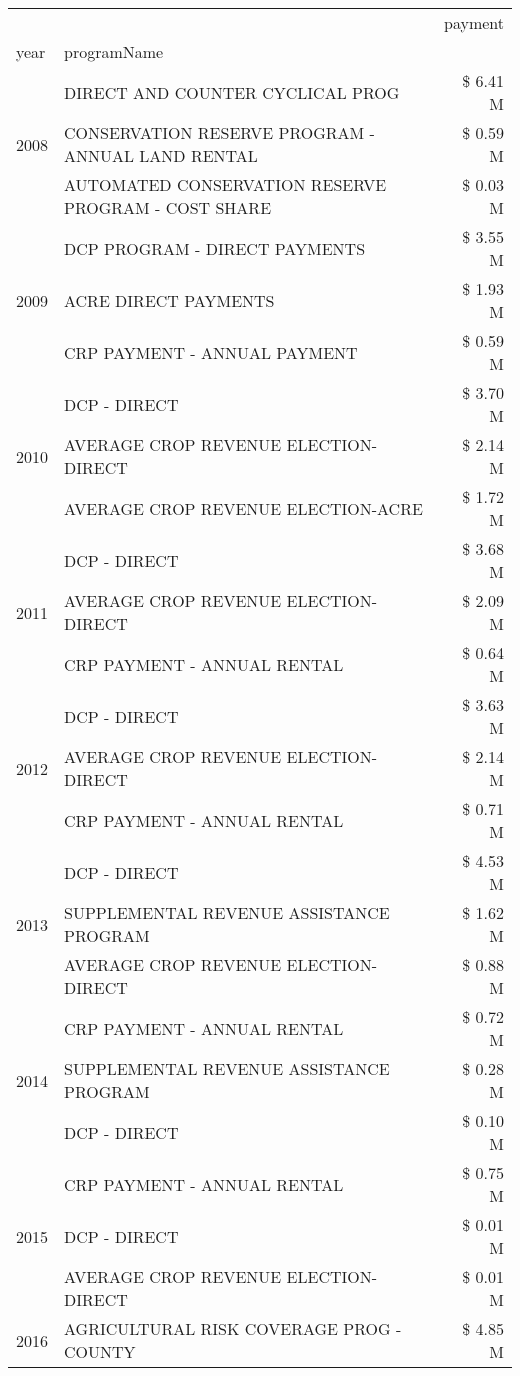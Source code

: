 \begin{tabular}{llr}
\toprule
 &  & payment \\
year & programName &  \\
\midrule
\multirow[t]{3}{*}{2008} & DIRECT AND COUNTER CYCLICAL PROG & \$ 6.41 M \\
 & CONSERVATION RESERVE PROGRAM - ANNUAL LAND RENTAL & \$ 0.59 M \\
 & AUTOMATED CONSERVATION RESERVE PROGRAM - COST SHARE & \$ 0.03 M \\
\cline{1-3}
\multirow[t]{3}{*}{2009} & DCP PROGRAM - DIRECT PAYMENTS & \$ 3.55 M \\
 & ACRE DIRECT PAYMENTS & \$ 1.93 M \\
 & CRP PAYMENT - ANNUAL PAYMENT & \$ 0.59 M \\
\cline{1-3}
\multirow[t]{3}{*}{2010} & DCP - DIRECT & \$ 3.70 M \\
 & AVERAGE CROP REVENUE ELECTION-DIRECT & \$ 2.14 M \\
 & AVERAGE CROP REVENUE ELECTION-ACRE & \$ 1.72 M \\
\cline{1-3}
\multirow[t]{3}{*}{2011} & DCP - DIRECT & \$ 3.68 M \\
 & AVERAGE CROP REVENUE ELECTION-DIRECT & \$ 2.09 M \\
 & CRP PAYMENT - ANNUAL RENTAL & \$ 0.64 M \\
\cline{1-3}
\multirow[t]{3}{*}{2012} & DCP - DIRECT & \$ 3.63 M \\
 & AVERAGE CROP REVENUE ELECTION-DIRECT & \$ 2.14 M \\
 & CRP PAYMENT - ANNUAL RENTAL & \$ 0.71 M \\
\cline{1-3}
\multirow[t]{3}{*}{2013} & DCP - DIRECT & \$ 4.53 M \\
 & SUPPLEMENTAL REVENUE ASSISTANCE PROGRAM & \$ 1.62 M \\
 & AVERAGE CROP REVENUE ELECTION-DIRECT & \$ 0.88 M \\
\cline{1-3}
\multirow[t]{3}{*}{2014} & CRP PAYMENT - ANNUAL RENTAL & \$ 0.72 M \\
 & SUPPLEMENTAL REVENUE ASSISTANCE PROGRAM & \$ 0.28 M \\
 & DCP - DIRECT & \$ 0.10 M \\
\cline{1-3}
\multirow[t]{3}{*}{2015} & CRP PAYMENT - ANNUAL RENTAL & \$ 0.75 M \\
 & DCP - DIRECT & \$ 0.01 M \\
 & AVERAGE CROP REVENUE ELECTION-DIRECT & \$ 0.01 M \\
\cline{1-3}
\multirow[t]{3}{*}{2016} & AGRICULTURAL RISK COVERAGE PROG - COUNTY & \$ 4.85 M \\

\end{tabular}
